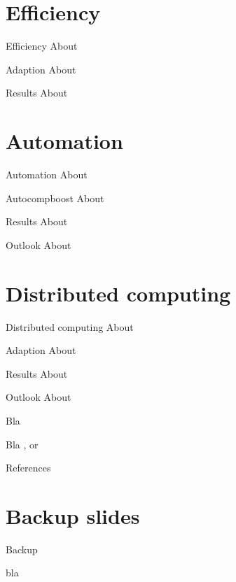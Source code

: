 \documentclass[10pt]{beamer}
\begin{document}
\section{Efficiency}

\begin{frame}{Efficiency}
  About
\end{frame}

\begin{frame}{Adaption}
  About
\end{frame}

\begin{frame}{Results}
  About
\end{frame}



\section{Automation}

\begin{frame}{Automation}
  About
\end{frame}

\begin{frame}{Autocompboost}
  About
\end{frame}

\begin{frame}{Results}
  About
\end{frame}

\begin{frame}{Outlook}
  About
\end{frame}


\section{Distributed computing}

\begin{frame}{Distributed computing}
  About
\end{frame}

\begin{frame}{Adaption}
  About
\end{frame}

\begin{frame}{Results}
  About
\end{frame}

\begin{frame}{Outlook}
  About
\end{frame}


\begin{frame}[allowframebreaks]{Bla}

  Bla
  \citep[see, e.g.,][]{Pepe2003}, or \cite{delong1988comparing}

\end{frame}

\appendix

\begin{frame}[allowframebreaks]{References}

\nocite{*}
\scriptsize


\end{frame}

\section{Backup slides}

\begin{frame}{Backup}

bla

\end{frame}
\end{document}
